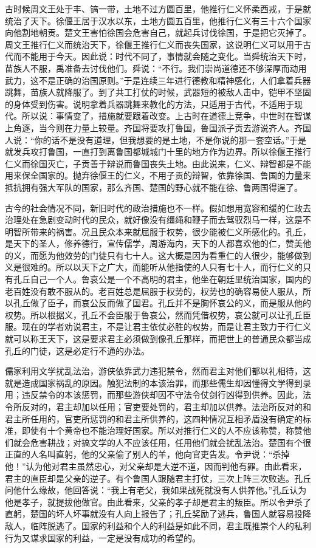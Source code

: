 \documentclass[12pt,UTF-8,openany,a4]{ctexbook}
\begin{document}
\begin{large}
    古时候周文王处于丰、镐一带，土地不过方圆百里，他推行仁义怀柔西戎，于是就统治了天下。徐偃王居于汉水以东，土地方圆五百里，他推行仁义有三十六个国家向他割地朝贡。楚文王害怕徐国会危害自己，就起兵讨伐徐国，于是把它灭掉了。周文王推行仁义而统治天下，徐偃王推行仁义而丧失国家，这说明仁义可以用于古代而不能用于今天。因此说：时代不同了，事情就会随之变化。当舜统治天下时，苗族人不服，禹准备去讨伐他们。舜说：“不行。我们崇尚道德还不够深厚而动用武力，这不是正确的治国原则。”于是连续三年进行德教和精神感化，人们拿着兵器跳舞，苗族人就降服了。到了共工打仗的时候，武器短的被敌人击中，铠甲不坚固的身体受到伤害。说明拿着兵器跳舞来教化的方法，只适用于古代，不适用于现代。所以说：事情变了，措施就要跟着改变。上古时在道德上竞争，中世时在智谋上角逐，当今则在力量上较量。齐国将要攻打鲁国，鲁国派子贡去游说齐人。齐国人说：“你的话不是没有道理，但我想要的是土地，不是你说的那一套空话。”于是就发兵攻打鲁国，一直打到离鲁国都城城门十里的地方作为边界。所以徐偃王推行仁义而徐国灭亡，子贡善于辩说而鲁国丧失土地。由此说来，仁义、辩智都是不能用来保全国家的。抛弃徐偃王的仁义，不用子贡的辩智，依靠徐国、鲁国的力量来抵抗拥有强大军队的国家，那么齐国、楚国的野心就不能在徐、鲁两国得逞了。
    
    古今的社会情况不同，新旧时代的政治措施也不一样。假如想用宽容和缓的仁政去治理处在急剧变动时代的民众，就好像没有缰绳和鞭子而去驾驭烈马一样，这是不明智所带来的祸害。况且民众本来就屈服于权势，很少能被仁义所感化的。孔丘，是天下的圣人，修养德行，宣传儒学，周游海内，天下的人都喜欢他的仁，赞美他的义，而愿为他效劳的门徒只有七十人。这大概是因为看重仁的人很少，能够做到义是很难的。所以以天下之广大，而能听从他指使的人只有七十人，而行仁义的只有孔丘自己一个人。鲁哀公是一个不高明的君主，他坐在朝廷里统治国家，国内的老百姓没有敢不服从的。老百姓总是屈服于权势的，权势也的确容易使人服从，所以孔丘做了臣子，而哀公反而做了国君。孔丘并不是胸怀哀公的义，而是服从他的权势。所以根据义，孔丘不会臣服于鲁哀公，然而凭借权势，哀公就可以让孔丘臣服。现在的学者劝说君主，不是让君主依仗必胜的权势，而是让君主致力于行仁义就可以称王天下，这是要求君主必须做到像孔丘那样，而把世上的普通民众都当成孔丘的门徒，这是必定行不通的办法。
    
    儒家利用文学扰乱法治，游侠依靠武力违犯禁令，然而君主对他们都以礼相待，这就是造成国家祸乱的原因。触犯法制的本该治罪，而那些儒生却因懂得文学得到录用；违反禁令的本该惩罚，而那些游侠却因不守法令仗剑行凶得到供养。因此，法令所反对的，君主却加以任用；官吏要处罚的，君主却加以供养。法治所反对的和君主所任用的，官吏所惩罚的和君主所供养的，这四种情况互相矛盾没有确定的标准，即使有十个黄帝也不能治理好国家。所以对推行仁义的人不应该称赞，称赞他们就会危害耕战；对搞文学的人不应该任用，任用他们就会扰乱法治。楚国有个很正直的人名叫直躬，他的父亲偷了别人的羊，他向官吏告发。令尹说：“杀掉他！”认为他对君主虽然忠心，对父亲却是大逆不道，因而判他有罪。由此看来，君主的直臣却是父亲的逆子。有个鲁国人跟随君主打仗，三次上阵三次败逃。孔丘问他什么缘故，他回答说：“我上有老父，我如果战死就没有人供养他。”孔丘认为他是孝子，就提拔他做官。由此看来，父亲的孝子却是君主的叛臣。所以令尹杀了直躬，楚国的坏人坏事就没有人向上报告了；孔丘奖励了逃兵，鲁国人就容易投降敌人，临阵脱逃了。国家的利益和个人的利益是如此不同，君主既推崇个人的私利行为又谋求国家的利益，一定是没有成功的希望的。
    

\end{large}
\end{document}
